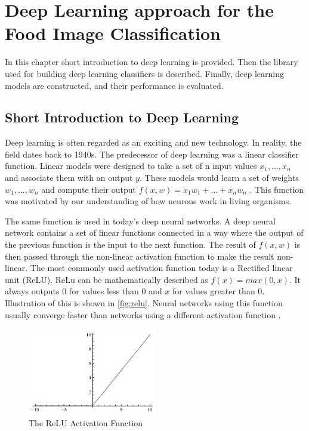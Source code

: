 \chapter{Deep Learning approach for the Food Image Classification}

In this chapter short introduction to deep learning is provided. Then the library used for building deep learning classifiers is described. Finally, deep learning models are constructed, and their performance is evaluated.


\section{Short Introduction to Deep Learning}

Deep learning is often regarded as an exciting and new technology. In reality, the field dates back to 1940s. The predecessor of deep learning was a linear classifier function. Linear models were designed to take a set of n input values \(x_1,...,x_n\) and associate them with an output \(y\). These models would learn a set of weights \(w_1,...,w_n \) and compute their output \(f(x,w)=x_1 w_1+...+x_n w_n\) \citep{Goodfellow-et-al-2017}. This function was motivated by our understanding of how neurons work in living organisms. 

The same function is used in today's deep neural networks. A deep neural network contains a set of linear functions connected in a way where the output of the previous function is the input to the next function. The result of \(f(x,w)\) is then passed through the non-linear activation function to make the result non-linear. The most commonly used activation function today is a Rectified linear unit (ReLU). ReLu can be mathematically described as \(f(x)=max(0,x)\). It always outputs 0 for values less than 0 and \(x\) for values greater than 0. Illustration of this is shown in \autoref{fig:relu}. Neural networks using this function usually converge faster than networks using a different activation function \citep{relu}.

\begin{figure}[h]
\centering
\includegraphics[width=0.5\textwidth]{Figures/relu.jpeg}
\caption{The ReLU Activation Function \citep{231nn}}
\label{fig:relu}
\end{figure}


